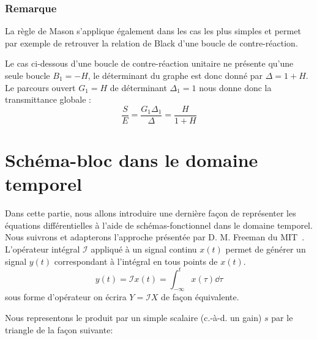 \subsubsection*{Remarque}
La règle de Mason s'applique également dans les cas les plus simples et permet
par exemple de retrouver la relation de Black d'une boucle de contre-réaction.
\begin{center}
    
\end{center}
Le cas ci-dessous d'une boucle de contre-réaction unitaire ne présente qu'une 
seule boucle $B_1=-H$, le déterminant du graphe est donc donné par $\Delta=1+H$.
Le parcours ouvert $G_1=H$ de déterminant $\Delta_1=1$ nous donne donc la 
transmittance globale :
\[
    \dfrac{S}{E}=\dfrac{G_1\Delta_1}{\Delta}=\dfrac{H}{1+H}
\]
\section{Schéma-bloc dans le domaine temporel}
Dans cette partie, nous allons introduire une dernière façon de représenter
les équations différentielles à l'aide de schémas-fonctionnel dans le domaine
temporel. Nous suivrons et adapterons l'approche présentée par D. M. Freeman du 
MIT~\cite{Freeman}.
L'opérateur intégral $\mathcal{I}$ appliqué à un signal 
continu $x(t)$ permet de générer un signal $y(t)$ correspondant 
à l'intégral en tous points de $x(t)$.
\[
    y(t)=\mathcal{I} x(t)=\int_{-\infty}^t x(\tau)\dd{\tau}
\]
sous forme d'opérateur on écrira $Y=\mathcal{I}X$ de façon équivalente.
\begin{center}
    
\end{center}
Nous representons le produit par un simple scalaire (c.-à-d. un gain) $s$ par 
le triangle de la façon suivante:

